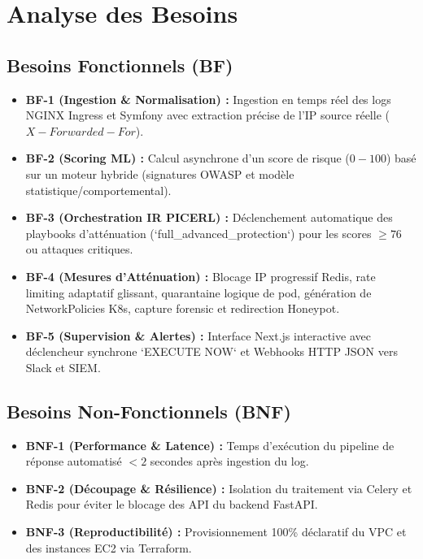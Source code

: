 \documentclass[12pt,a4paper]{report}
\begin{document}
\chapter{Analyse des Besoins}

\section{Besoins Fonctionnels (BF)}
\begin{itemize}
    \item \textbf{BF-1 (Ingestion & Normalisation) :} Ingestion en temps réel des logs NGINX Ingress et Symfony avec extraction précise de l'IP source réelle ($X-Forwarded-For$).
    \item \textbf{BF-2 (Scoring ML) :} Calcul asynchrone d'un score de risque ($0 - 100$) basé sur un moteur hybride (signatures OWASP et modèle statistique/comportemental).
    \item \textbf{BF-3 (Orchestration IR PICERL) :} Déclenchement automatique des playbooks d'atténuation (`full_advanced_protection`) pour les scores $\ge 76$ ou attaques critiques.
    \item \textbf{BF-4 (Mesures d'Atténuation) :} Blocage IP progressif Redis, rate limiting adaptatif glissant, quarantaine logique de pod, génération de NetworkPolicies K8s, capture forensic et redirection Honeypot.
    \item \textbf{BF-5 (Supervision & Alertes) :} Interface Next.js interactive avec déclencheur synchrone `EXECUTE NOW` et Webhooks HTTP JSON vers Slack et SIEM.
\end{itemize}

\section{Besoins Non-Fonctionnels (BNF)}
\begin{itemize}
    \item \textbf{BNF-1 (Performance & Latence) :} Temps d'exécution du pipeline de réponse automatisé $< 2$ secondes après ingestion du log.
    \item \textbf{BNF-2 (Découpage & Résilience) :} Isolation du traitement via Celery et Redis pour éviter le blocage des API du backend FastAPI.
    \item \textbf{BNF-3 (Reproductibilité) :} Provisionnement 100\% déclaratif du VPC et des instances EC2 via Terraform.
\end{itemize}

\end{document}
